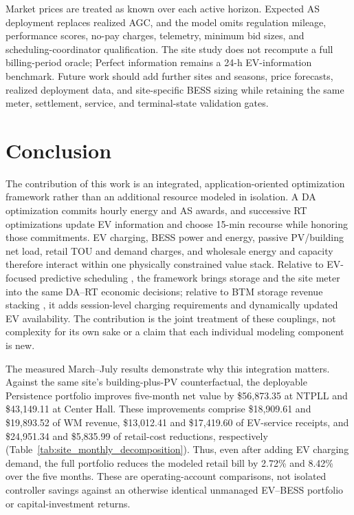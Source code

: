 \documentclass[final,5p,times]{elsarticle}
\begin{document}
Market prices are treated as known over each active horizon. Expected AS
deployment replaces realized AGC, and the model omits regulation mileage,
performance scores, no-pay charges, telemetry, minimum bid sizes, and
scheduling-coordinator qualification. The site study does not recompute a full
billing-period oracle; Perfect information remains a 24-h EV-information
benchmark. Future work should add further sites and seasons, price forecasts,
realized deployment data, and site-specific BESS sizing while retaining the
same meter, settlement, service, and terminal-state validation gates.

\section{Conclusion}
\label{sec:conclusion}

The contribution of this work is an integrated, application-oriented
optimization framework rather than an additional resource modeled in isolation.
A DA optimization commits hourly energy and AS awards, and successive RT
optimizations update EV information and choose 15-min recourse while honoring
those commitments. EV charging, BESS power and energy, passive PV/building
net load, retail TOU and demand charges, and wholesale energy and capacity
therefore interact within one physically constrained value stack. Relative to
EV-focused predictive scheduling \cite{chen2026realtime}, the framework brings
storage and the site meter into the same DA--RT economic decisions; relative
to BTM storage revenue stacking \cite{seward2022revenueStacking}, it adds
session-level charging requirements and dynamically updated EV availability.
The contribution is the joint treatment of these couplings, not complexity
for its own sake or a claim that each individual modeling component is new.

The measured March--July results demonstrate why this integration matters.
Against the same site's building-plus-PV counterfactual, the deployable
Persistence portfolio improves five-month net value by \$56,873.35 at NTPLL
and \$43,149.11 at Center Hall. These improvements comprise \$18,909.61
and \$19,893.52 of WM revenue, \$13,012.41 and \$17,419.60 of EV-service
receipts, and \$24,951.34 and \$5,835.99 of retail-cost reductions,
respectively (Table~\ref{tab:site_monthly_decomposition}). Thus, even after
adding EV charging demand, the full portfolio reduces the modeled retail bill
by 2.72\% and 8.42\% over the five months. These are operating-account
comparisons, not isolated controller savings against an otherwise identical
unmanaged EV--BESS portfolio or capital-investment returns.
\end{document}
